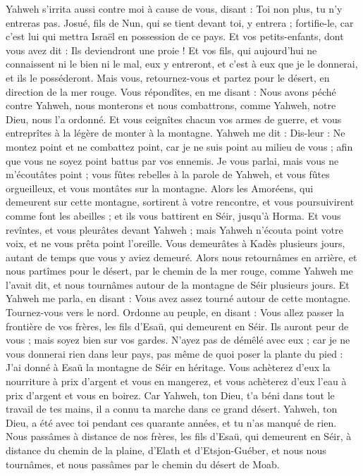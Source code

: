 \begin{multicols}{2}
Yahweh s'irrita aussi contre moi à cause de vous, disant : Toi non plus, tu n’y entreras pas.
Josué, fils de Nun, qui se tient devant toi, y entrera ; fortifie-le, car c'est lui qui mettra Israël en possession de ce pays.
Et vos petits-enfants, dont vous avez dit : Ils deviendront une proie ! Et vos fils, qui aujourd'hui ne connaissent ni le bien ni le mal, eux y entreront, et c’est à eux que je le donnerai, et ils le posséderont.
Mais vous, retournez-vous et partez pour le désert, en direction de la mer rouge.
Vous répondîtes, en me disant : Nous avons péché contre Yahweh, nous monterons et nous combattrons, comme Yahweh, notre Dieu, nous l’a ordonné. Et vous ceignîtes chacun vos armes de guerre, et vous entreprîtes à la légère de monter à la montagne.
Yahweh me dit : Dis-leur : Ne montez point et ne combattez point, car je ne suis point au milieu de vous ; afin que vous ne soyez point battus par vos ennemis.
Je vous parlai, mais vous ne m'écoutâtes point ; vous fûtes rebelles à la parole de Yahweh, et vous fûtes orgueilleux, et vous montâtes sur la montagne.
Alors les Amoréens, qui demeurent sur cette montagne, sortirent à votre rencontre, et vous poursuivirent comme font les abeilles ; et ils vous battirent en Séir, jusqu'à Horma.
Et vous revîntes, et vous pleurâtes devant Yahweh ; mais Yahweh n'écouta point votre voix, et ne vous prêta point l'oreille.
Vous demeurâtes à Kadès plusieurs jours, autant de temps que vous y aviez demeuré.
\VerseOne{}Alors nous retournâmes en arrière, et nous partîmes pour le désert, par le chemin de la mer rouge, comme Yahweh me l'avait dit, et nous tournâmes autour de la montagne de Séir plusieurs jours.
Et Yahweh me parla, en disant :
Vous avez assez tourné autour de cette montagne. Tournez-vous vers le nord.
Ordonne au peuple, en disant : Vous allez passer la frontière de vos frères, les fils d'Esaü, qui demeurent en Séir. Ils auront peur de vous ; mais soyez bien sur vos gardes.
N’ayez pas de démêlé avec eux ; car je ne vous donnerai rien dans leur pays, pas même de quoi poser la plante du pied : J'ai donné à Esaü la montagne de Séir en héritage.
Vous achèterez d'eux la nourriture à prix d'argent et vous en mangerez, et vous achèterez d'eux l’eau à prix d'argent et vous en boirez.
Car Yahweh, ton Dieu, t'a béni dans tout le travail de tes mains, il a connu ta marche dans ce grand désert. Yahweh, ton Dieu, a été avec toi pendant ces quarante années, et tu n'as manqué de rien.
Nous passâmes à distance de nos frères, les fils d'Esaü, qui demeurent en Séir, à distance du chemin de la plaine, d’Elath et d’Etsjon-Guéber, et nous nous tournâmes, et nous passâmes par le chemin du désert de Moab.

\end{multicols}
